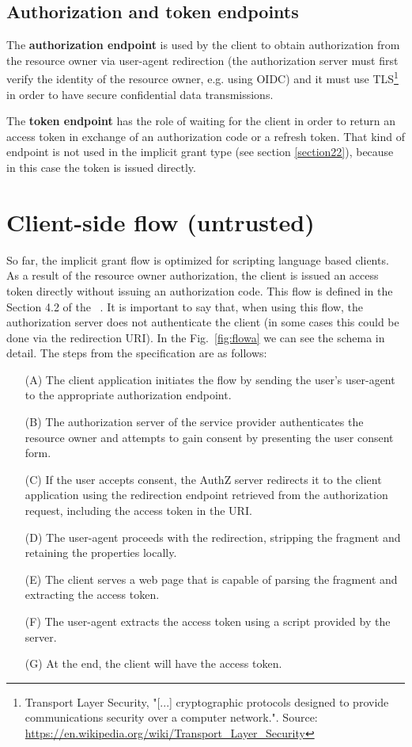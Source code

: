 \subsection{Authorization and token endpoints}
The \textbf{authorization endpoint} is used by the client to obtain authorization from the resource owner via user-agent redirection (the authorization server must first verify the identity of the resource owner, e.g. using OIDC) and it must use TLS\footnote{Transport Layer Security, "[...] cryptographic protocols designed to provide communications security over a computer network.". Source: \url{https://en.wikipedia.org/wiki/Transport_Layer_Security}} in order to have secure confidential data transmissions.

The \textbf{token endpoint} has the role of waiting for the client in order to return an access token in exchange of an authorization code or a refresh token. That kind of endpoint is not used in the implicit grant type (see section \ref{section22}), because in this case the token is issued directly.

\section{Client-side flow (untrusted)}
So far, the implicit grant flow is optimized for scripting language based clients. As a result of the resource owner authorization, the client is issued an access token directly without issuing an authorization code. This flow is defined in the Section 4.2 of the \ \cite{RFC6749}. It is important to say that, when using this flow, the authorization server does not authenticate the client (in some cases this could be done via the redirection URI). In the Fig.~\ref{fig:flowa} we can see the schema in detail. The steps from the specification are as follows:

\begin{itemize}
    \item[(A)]The client application initiates the flow by sending the user's user-agent to the appropriate authorization endpoint.
    \item[(B)]The authorization server of the service provider authenticates the resource owner and attempts to gain consent by presenting the user consent form.
    \item[(C)]If the user accepts consent, the AuthZ server redirects it to the client application using the redirection endpoint retrieved from the authorization request, including the access token in the URI.
    \item[(D)]The user-agent proceeds with the redirection, stripping the fragment and retaining the properties locally.
    \item[(E)]The client serves a web page that is capable of parsing the fragment and extracting the access token.
    \item[(F)]The user-agent extracts the access token using a script provided by the server.
    \item[(G)] At the end, the client will have the access token.
\end{itemize}

